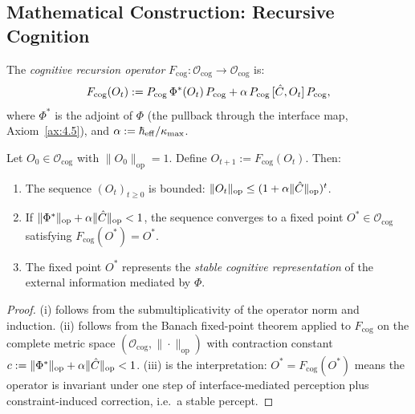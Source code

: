 \subsection{Mathematical Construction: Recursive Cognition}

\begin{definition}\label{def:16.4}
The \emph{cognitive recursion operator} $F_{\mathrm{cog}} :
\mathcal{O}_{\mathrm{cog}} \to \mathcal{O}_{\mathrm{cog}}$ is:
\[
  F_{\mathrm{cog}}(O_t) := P_{\mathrm{cog}}\, \Phi^*(O_t)\, P_{\mathrm{cog}}
  + \alpha\, P_{\mathrm{cog}}\, [\hat{C}, O_t]\, P_{\mathrm{cog}},
\]
where $\Phi^*$ is the adjoint of $\Phi$ (the pullback through the
interface map, Axiom~\ref{ax:4.5}), and $\alpha := \hbar_{\mathrm{eff}} / \kappa_{\max}$.
\end{definition}

\begin{theorem}\label{thm:16.1}
Let $O_0 \in \mathcal{O}_{\mathrm{cog}}$ with $\|O_0\|_{\mathrm{op}} = 1$.
Define $O_{t+1} := F_{\mathrm{cog}}(O_t)$.  Then:
\begin{enumerate}
  \item[\textup{(i)}] The sequence $(O_t)_{t \geq 0}$ is bounded:
    $\|O_t\|_{\mathrm{op}} \leq (1 + \alpha \|\hat{C}\|_{\mathrm{op}})^t$.
  \item[\textup{(ii)}] If $\|\Phi^*\|_{\mathrm{op}} + \alpha \|\hat{C}\|_{\mathrm{op}} < 1$,
    the sequence converges to a fixed point $O^* \in \mathcal{O}_{\mathrm{cog}}$
    satisfying $F_{\mathrm{cog}}(O^*) = O^*$.
  \item[\textup{(iii)}] The fixed point $O^*$ represents the
    \emph{stable cognitive representation} of the external information
    mediated by $\Phi$.
\end{enumerate}
\end{theorem}

\begin{proof}
(i) follows from the submultiplicativity of the operator norm and
induction.  (ii) follows from the Banach fixed-point theorem applied
to $F_{\mathrm{cog}}$ on the complete metric space
$(\mathcal{O}_{\mathrm{cog}}, \|\cdot\|_{\mathrm{op}})$ with
contraction constant $c := \|\Phi^*\|_{\mathrm{op}} + \alpha
\|\hat{C}\|_{\mathrm{op}} < 1$.  (iii) is the interpretation:
$O^* = F_{\mathrm{cog}}(O^*)$ means the operator is invariant under
one step of interface-mediated perception plus constraint-induced
correction, i.e.\ a stable percept.
\end{proof}

